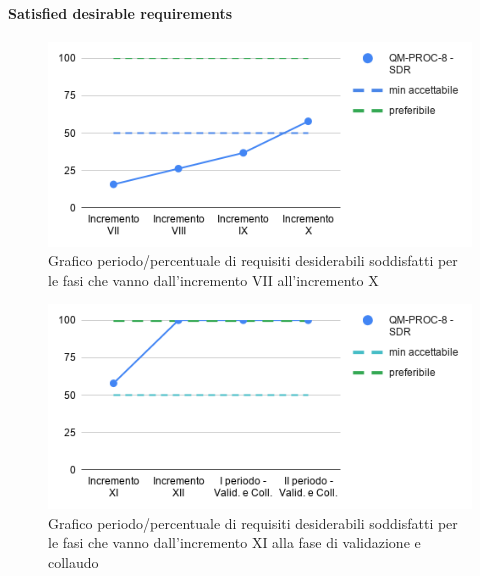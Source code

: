 \paragraph{Satisfied desirable requirements}
	\begin{figure}[H]
			\centering
			\includegraphics[width=0.8\linewidth]{./res/images/QM-PROC-8-SDR.png}
			\caption{Grafico periodo/percentuale di requisiti desiderabili soddisfatti per le fasi che vanno dall'incremento VII all'incremento X}
			\label{fig:Grafico periodo/percentuale di requisiti desiderabili soddisfatti per le fasi che vanno dall'incremento VII all'incremento X}
	\end{figure}
	\begin{figure}[H]
			\centering
			\includegraphics[width=0.8\linewidth]{./res/images/QM-PROC-8-SDR_1.png}
			\caption{Grafico periodo/percentuale di requisiti desiderabili soddisfatti per le fasi che vanno dall'incremento XI alla fase di validazione e collaudo}
			\label{fig:Grafico periodo/percentuale di requisiti desiderabili soddisfatti per le fasi che vanno dall'incremento XI alla fase di validazione e collaudo}
	\end{figure}

